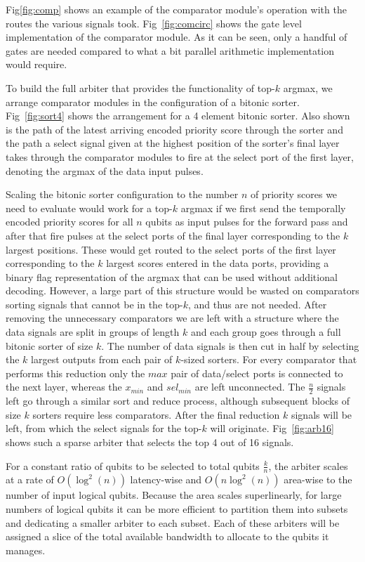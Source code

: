 Fig\ref{fig:comp} shows an example of the comparator module's operation with the routes the 
various signals took.
Fig~\ref{fig:comcirc} shows the gate level implementation of the comparator module.
As it can be seen, only a handful of gates are needed compared to what a bit parallel arithmetic implementation would require.

To build the full arbiter that provides the functionality of top-$k$ argmax, we arrange comparator modules in the configuration of a bitonic sorter.
Fig~\ref{fig:sort4} shows the arrangement for a 4 element bitonic sorter.
Also shown is the path of the latest arriving encoded priority score through the sorter and the path a select signal given at the highest position of the sorter's final layer takes through the comparator modules to fire at the select port of the first layer, denoting the argmax of the data input pulses.

Scaling the bitonic sorter configuration to the number $n$ of priority scores we need to evaluate would work for a top-$k$ argmax if we first send the temporally encoded priority scores for all $n$ qubits as input pulses for the forward pass and after that fire pulses at the select ports of the final layer corresponding to the $k$ largest positions.
These would get routed to the select ports of the first layer corresponding to the $k$ largest scores entered in the data ports, providing a binary flag representation of the argmax that can be used without additional decoding.
However, a large part of this structure would be wasted on comparators sorting signals that cannot be in the top-$k$, and thus are not needed.
After removing the unnecessary comparators we are left with a structure where the data signals are split in groups of length $k$ and each group goes through a full bitonic sorter of size $k$.
The number of data signals is then cut in half by selecting the $k$ largest outputs from each pair of $k$-sized sorters.
For every comparator that performs this reduction only the $max$ pair of data/select ports is connected to the next layer, whereas the $x_{min}$ and $sel_{min}$ are left unconnected.
The $\frac{n}{2}$ signals left go through a similar sort and reduce process, although subsequent blocks of size $k$ sorters require less comparators. 
After the final reduction $k$ signals will be left, from which the select signals for the top-$k$ will originate.
Fig~\ref{fig:arb16} shows such a sparse arbiter that selects the top 4 out of 16 signals.

For a constant ratio of qubits to be selected to total qubits $\frac{k}{n}$, the arbiter scales at a rate of $O(\log^2(n))$ latency-wise and $O(n\log^2(n))$ area-wise to the number of input logical qubits.
Because the area scales superlinearly, for large numbers of logical qubits it can be more efficient to partition them into subsets and dedicating a smaller arbiter to each subset.
Each of these arbiters will be assigned a slice of the total available bandwidth to allocate to the qubits it manages.

